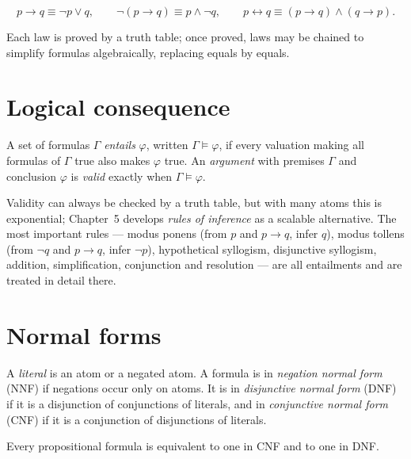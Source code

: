 \begin{theorem}\label{thm:impl}
\[
p \to q \equiv \neg p \vee q, \qquad
\neg(p \to q) \equiv p \wedge \neg q, \qquad
p \leftrightarrow q \equiv (p \to q) \wedge (q \to p).
\]
\end{theorem}

Each law is proved by a truth table; once proved, laws may be chained to
simplify formulas algebraically, replacing equals by equals.

\section{Logical consequence}

\begin{definition}[Entailment]
A set of formulas $\Gamma$ \emph{entails} $\varphi$, written
$\Gamma \models \varphi$, if every valuation making all formulas of $\Gamma$
true also makes $\varphi$ true. An \emph{argument} with premises $\Gamma$ and
conclusion $\varphi$ is \emph{valid} exactly when $\Gamma \models \varphi$.
\end{definition}

Validity can always be checked by a truth table, but with many atoms this is
exponential; Chapter~5 develops \emph{rules of inference} as a scalable
alternative. The most important rules --- modus ponens (from $p$ and
$p \to q$, infer $q$), modus tollens (from $\neg q$ and $p \to q$, infer
$\neg p$), hypothetical syllogism, disjunctive syllogism, addition,
simplification, conjunction and resolution --- are all entailments and are
treated in detail there.

\section{Normal forms}

\begin{definition}
A \emph{literal} is an atom or a negated atom. A formula is in
\emph{negation normal form} (NNF) if negations occur only on atoms.
It is in \emph{disjunctive normal form} (DNF) if it is a disjunction of
conjunctions of literals, and in \emph{conjunctive normal form} (CNF) if it is
a conjunction of disjunctions of literals.
\end{definition}

\begin{theorem}
Every propositional formula is equivalent to one in CNF and to one in DNF.
\end{theorem}

